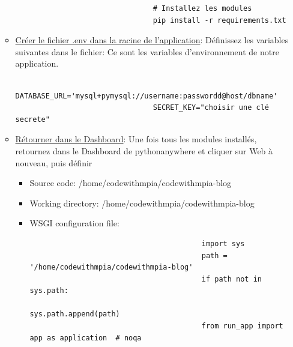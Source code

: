 \documentclass[a4paper,11pt]{article}
\begin{document}
\begin{enumerate}
\begin{itemize}
\begin{tcolorbox}[colback=lightgray!6, colframe=black, left=-60mm, right=5mm, top=2mm, bottom=2mm, boxrule=0.1mm]
\begin{verbatim}
                                # Installez les modules
                                pip install -r requirements.txt
                            \end{verbatim}
                        \end{tcolorbox}
                    \item \underline{Créer le fichier .env dans la racine de l'application}:
                        \noindent Définissez les variables suivantes dans le fichier: Ce sont les variables d'environnement de notre application.
                        \begin{tcolorbox}[colback=lightgray!6, colframe=black, left=-60mm, right=5mm, top=2mm, bottom=2mm, boxrule=0.1mm]
                            \begin{verbatim}
                                DATABASE_URL='mysql+pymysql://username:passwordd@host/dbname'
                                SECRET_KEY="choisir une clé secrete"
                            \end{verbatim}
                        \end{tcolorbox}
                    \item \underline{Rétourner dans le Dashboard}: Une fois tous les modules installés, retournez dans le Dashboard de pythonanywhere et cliquer sur Web à nouveau, puis définir
                        \begin{itemize}
                            \item Source code: /home/codewithmpia/codewithmpia-blog
                            \item Working directory: /home/codewithmpia/codewithmpia-blog
                            \item WSGI configuration file: 
                                \begin{tcolorbox}[colback=lightgray!6, colframe=black, left=-70mm, right=5mm, top=2mm, bottom=2mm, boxrule=0.1mm]
                                    \begin{verbatim}
                                        import sys
                                        path = '/home/codewithmpia/codewithmpia-blog'
                                        if path not in sys.path:
                                            sys.path.append(path)
                                        from run_app import app as application  # noqa
                                    \end{verbatim}
                                \end{tcolorbox}

\end{itemize}
\end{itemize}
\end{enumerate}
\end{document}
